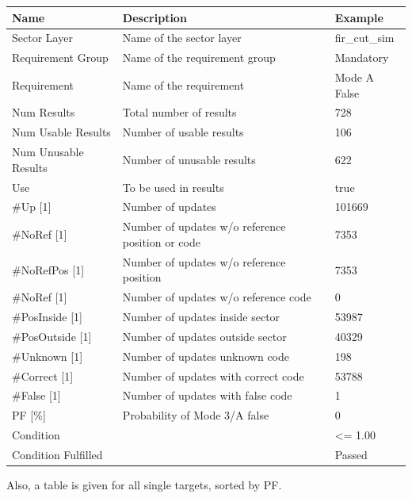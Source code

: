 \begin{center}
 \begin{table}[H]
  \begin{tabularx}{\textwidth}{ | l | X |  l | }
    \hline
    \textbf{Name} & \textbf{Description} & \textbf{Example} \\ \hline
    Sector Layer & Name of the sector layer & fir\_cut\_sim \\ \hline
    Requirement Group & Name of the requirement group & Mandatory \\ \hline
    Requirement & Name of the requirement & Mode A False \\ \hline
    Num Results & Total number of results & 728 \\ \hline
    Num Usable Results & Number of usable results & 106 \\ \hline
    Num Unusable Results & Number of unusable results & 622 \\ \hline
    Use & To be used in results & true \\ \hline
    \#Up [1] & Number of updates & 101669 \\ \hline
    \#NoRef [1] & Number of updates w/o reference position or code & 7353 \\ \hline
    \#NoRefPos [1] & Number of updates w/o reference position  & 7353 \\ \hline
    \#NoRef [1] & Number of updates w/o reference code & 0 \\ \hline
    \#PosInside [1] & Number of updates inside sector & 53987 \\ \hline
    \#PosOutside [1] & Number of updates outside sector & 40329 \\ \hline
    \#Unknown [1] & Number of updates unknown code & 198 \\ \hline
    \#Correct [1] & Number of updates with correct code & 53788 \\ \hline
    \#False [1] & Number of updates with false code & 1 \\ \hline
    PF [\%] & Probability of Mode 3/A false & 0 \\ \hline
    Condition &  & <= 1.00 \\ \hline
    Condition Fulfilled &  & Passed \\ \hline
\end{tabularx}
\end{table}
\end{center}

Also, a table is given for all single targets, sorted by PF.


